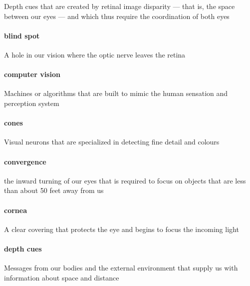 \documentclass[
]{krantz}
\begin{document}
Depth cues that are created by retinal image disparity --- that is, the space between our eyes --- and which thus require the coordination of both eyes

\paragraph*{blind spot}\label{blind-spot}

A hole in our vision where the optic nerve leaves the retina

\paragraph*{computer vision}\label{computer-vision}

Machines or algorithms that are built to mimic the human sensation and perception system

\paragraph*{cones}\label{cones}

Visual neurons that are specialized in detecting fine detail and colours

\paragraph*{convergence}\label{convergence}

the inward turning of our eyes that is required to focus on objects that are less than about 50 feet away from us

\paragraph*{cornea}\label{cornea}

A clear covering that protects the eye and begins to focus the incoming light

\paragraph*{depth cues}\label{depth-cues}

Messages from our bodies and the external environment that supply us with information about space and distance
\end{document}
